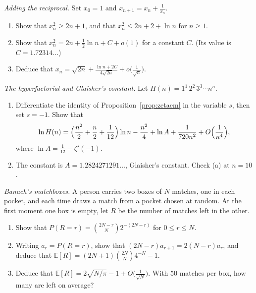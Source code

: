 \begin{exercise}[$\star\star$]\label{pb:xplusinv}
\emph{Adding the reciprocal.} Set $x_0=1$ and $x_{n+1}=x_n+\frac1{x_n}$.
\begin{enumerate}[label=(\alph*)]
\item Show that $x_n^2\ge2n+1$, and that $x_n^2\le2n+2+\ln n$ for $n\ge1$.
\item Show that $x_n^2=2n+\frac12\ln n+C+o(1)$ for a constant $C$. (Its value is $C=1.72314\ldots$)
\item Deduce that $x_n=\sqrt{2n}+\frac{\ln n+2C}{4\sqrt{2n}}+o\bigl(\frac1{\sqrt n}\bigr)$.
\end{enumerate}
\end{exercise}

\begin{exercise}[$\star\star\star$]\label{pb:hyperfactorial}
\emph{The hyperfactorial and Glaisher's constant.} Let $H(n)=1^1\,2^2\,3^3\cdots n^n$.
\begin{enumerate}[label=(\alph*)]
\item Differentiate the identity of Proposition~\ref{prop:zetaem} in the variable $s$, then set $s=-1$. Show that
\[
\ln H(n)=\Bigl(\frac{n^2}2+\frac n2+\frac1{12}\Bigr)\ln n-\frac{n^2}4+\ln A+\frac1{720n^2}+O\Bigl(\frac1{n^4}\Bigr),
\]
where $\ln A=\frac1{12}-\zeta'(-1)$.
\item The constant is $A=1.2824271291\ldots$, Glaisher's constant. Check (a) at $n=10$.
\end{enumerate}
\end{exercise}

\begin{exercise}[$\star\star$]\label{pb:banach}
\emph{Banach's matchboxes.} A person carries two boxes of $N$ matches, one in each pocket, and each time draws a match from a pocket chosen at random. At the first moment one box is empty, let $R$ be the number of matches left in the other.
\begin{enumerate}[label=(\alph*)]
\item Show that $P(R=r)=\binom{2N-r}N2^{-(2N-r)}$ for $0\le r\le N$.
\item Writing $a_r=P(R=r)$, show that $(2N-r)a_{r+1}=2(N-r)a_r$, and deduce that $\mathbb E[R]=(2N+1)\binom{2N}N4^{-N}-1$.
\item Deduce that $\mathbb E[R]=2\sqrt{N/\pi}-1+O\bigl(\frac1{\sqrt N}\bigr)$. With $50$ matches per box, how many are left on average?
\end{enumerate}
\end{exercise}

